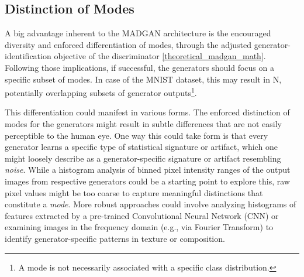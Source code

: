 \subsection{Distinction of Modes}
\noindent A big advantage inherent to the MADGAN architecture is the encouraged diversity and enforced differentiation of modes, through the adjusted generator-identification objective of the discriminator \ref{theoretical_madgan_math}. Following those implications, if successful, the generators should focus on a specific subset of modes. In case of the MNIST dataset, this may result in N, potentially overlapping subsets of generator outputs\footnote{A mode is not necessarily associated with a specific class distribution.}.

This differentiation could manifest in various forms. The enforced distinction of modes for the generators might result in subtle differences that are not easily perceptible to the human eye. One way this could take form is that every generator learns a specific type of statistical signature or artifact, which one might loosely describe as a generator-specific signature or artifact resembling \textit{noise}. While a histogram analysis of binned pixel intensity ranges of the output images from respective generators could be a starting point to explore this, raw pixel values might be too coarse to capture meaningful distinctions that constitute a \textit{mode}. More robust approaches could involve analyzing histograms of features extracted by a pre-trained Convolutional Neural Network (CNN) or examining images in the frequency domain (e.g., via Fourier Transform) to identify generator-specific patterns in texture or composition.

